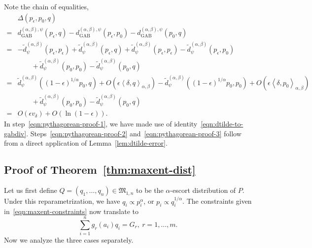 \documentclass[11pt]{article}
\theoremstyle{plain}
\theoremstyle{remark}
\newcommand{\Mfrak}{\mathfrak{M}}
\newcommand{\dGAB}{d_{\mathrm{GAB}}}
\newcommand{\inner}[1]{\left\langle #1\right\rangle}
\begin{document}
Note the chain of equalities,
\begin{align}
        & \Delta(p_\epsilon,p_0,q)\nonumber                                                                                                                                                                                                           \\
    ={} & \dGAB^{(\alpha,\beta),\psi}(p_\epsilon, q) - \dGAB^{(\alpha,\beta),\psi}(p_\epsilon, p_0) - \dGAB^{(\alpha,\beta),\psi}(p_0, q)\nonumber                                                                                                    \\
    ={} & -\tilde{d}_{\psi}^{(\alpha,\beta)}(p_\epsilon,p_\epsilon) + \tilde{d}_{\psi}^{(\alpha,\beta)}(p_\epsilon,q) + \tilde{d}_{\psi}^{(\alpha,\beta)}(p_\epsilon,p_\epsilon) - \tilde{d}_{\psi}^{(\alpha,\beta)}(p_\epsilon,p_0) \nonumber        \\
        & \qquad + \tilde{d}_{\psi}^{(\alpha,\beta)}(p_0,p_0) - \tilde{d}_{\psi}^{(\alpha,\beta)}(p_0,q) \label{eqn:pythagorean-proof-1}                                                                                                              \\
    ={} & \tilde{d}_{\psi}^{(\alpha,\beta)}((1-\epsilon)^{1/\alpha} p_0,q) + O(\epsilon \inner{\delta,q}_{\alpha,\beta}) - \tilde{d}_{\psi}^{(\alpha,\beta)}((1-\epsilon)^{1/\alpha}p_0,p_0) + O(\epsilon \inner{\delta,p_0}_{\alpha,\beta})\nonumber \\
        & \qquad  + \tilde{d}_{\psi}^{(\alpha,\beta)}(p_0,p_0) - \tilde{d}_{\psi}^{(\alpha,\beta)}(p_0,q) \label{eqn:pythagorean-proof-2}                                                                                                             \\
    ={} & O(\epsilon v_\delta) + O(\ln(1-\epsilon)) \label{eqn:pythagorean-proof-3}.
\end{align}
\noindent In step~\eqref{eqn:pythagorean-proof-1}, we have made use of identity~\eqref{eqn:dtilde-to-gabdiv}. Steps~\eqref{eqn:pythagorean-proof-2} and~\eqref{eqn:pythagorean-proof-3} follow from a direct application of Lemma~\ref{lem:dtilde-error}.

\subsection{Proof of Theorem~\ref{thm:maxent-dist}}

Let us first define $Q = (q_1, \dots, q_n) \in \Mfrak_{1, n}$ to be the $\alpha$-escort distribution of $P$. Under this reparametrization, we have $q_i \propto p_i^\alpha$, or $p_i \propto q_i^{1/\alpha}$. The constraints given in~\eqref{eqn:maxent-constraints} now translate to
\begin{equation*}
    \sum_{i=1}^n g_r(a_i) q_i = G_r, \ r = 1, \dots, m.
\end{equation*}
\noindent Now we analyze the three cases separately.
\end{document}
